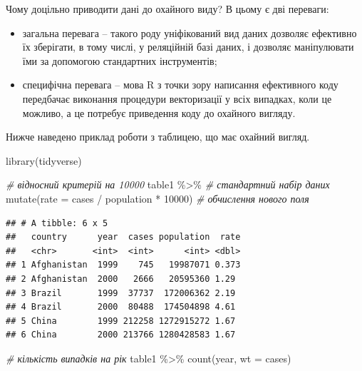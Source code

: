 \documentclass[
]{book}
\newenvironment{Shaded}{\begin{snugshade}}{\end{snugshade}}
\newcommand{\AttributeTok}[1]{\textcolor[rgb]{0.77,0.63,0.00}{#1}}
\newcommand{\CommentTok}[1]{\textcolor[rgb]{0.56,0.35,0.01}{\textit{#1}}}
\newcommand{\DecValTok}[1]{\textcolor[rgb]{0.00,0.00,0.81}{#1}}
\newcommand{\FunctionTok}[1]{\textcolor[rgb]{0.00,0.00,0.00}{#1}}
\newcommand{\NormalTok}[1]{#1}
\newcommand{\SpecialCharTok}[1]{\textcolor[rgb]{0.00,0.00,0.00}{#1}}
\providecommand{\tightlist}{%
  \setlength{\itemsep}{0pt}\setlength{\parskip}{0pt}}
\begin{document}
Чому доцільно приводити дані до охайного виду? В цьому є дві переваги:

\begin{itemize}
\tightlist
\item
  загальна перевага -- такого роду уніфікований вид даних дозволяє ефективно їх зберігати, в тому числі, у реляційній базі даних, і дозволяє маніпулювати їми за допомогою стандартних інструментів;
\item
  специфічна перевага -- мова R з точки зору написання ефективного коду передбачає виконання процедури векторизації у всіх випадках, коли це можливо, а це потребує приведення коду до охайного вигляду.
\end{itemize}

Нижче наведено приклад роботи з таблицею, що має охайний вигляд.

\begin{Shaded}
\begin{Highlighting}[]
\FunctionTok{library}\NormalTok{(tidyverse)}
\end{Highlighting}
\end{Shaded}

\begin{Shaded}
\begin{Highlighting}[]
\CommentTok{\# відносний критерій на 10000}
\NormalTok{table1 }\SpecialCharTok{\%\textgreater{}\%}  \CommentTok{\# стандартний набір даних}
  \FunctionTok{mutate}\NormalTok{(}\AttributeTok{rate =}\NormalTok{ cases }\SpecialCharTok{/}\NormalTok{ population }\SpecialCharTok{*} \DecValTok{10000}\NormalTok{) }\CommentTok{\# обчислення нового поля}
\end{Highlighting}
\end{Shaded}

\begin{verbatim}
## # A tibble: 6 x 5
##   country      year  cases population  rate
##   <chr>       <int>  <int>      <int> <dbl>
## 1 Afghanistan  1999    745   19987071 0.373
## 2 Afghanistan  2000   2666   20595360 1.29 
## 3 Brazil       1999  37737  172006362 2.19 
## 4 Brazil       2000  80488  174504898 4.61 
## 5 China        1999 212258 1272915272 1.67 
## 6 China        2000 213766 1280428583 1.67
\end{verbatim}

\begin{Shaded}
\begin{Highlighting}[]
\CommentTok{\# кількість випадків на рік}
\NormalTok{table1 }\SpecialCharTok{\%\textgreater{}\%} 
  \FunctionTok{count}\NormalTok{(year, }\AttributeTok{wt =}\NormalTok{ cases)}
\end{Highlighting}
\end{Shaded}
\end{document}
